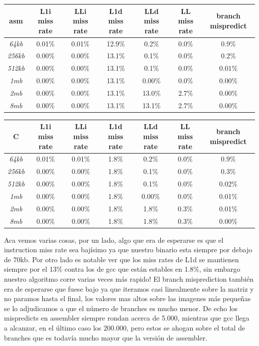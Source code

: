\documentclass[a4paper]{article}
\begin{document}
\begin{center}
	\begin{tabular}[c]{|c|c|c|c|c|c|c|}
    \hline
        \textbf{asm} &  \textbf{L1i miss rate} & \textbf{LLi miss rate} & \textbf{L1d miss rate} & \textbf{LLd miss rate} & \textbf{LL miss rate} & \textbf{branch mispredict}\\
        \hline
\textit{64kb} &    0.01\%  & 0.01\% & 12.9\% & 0.2\% & 0.0\% & 0.9\% \\
        \hline
\textit{256kb} &   0.00\%    & 0.00\% & 13.1\% & 0.1\% & 0.0\% & 0.2\% \\
        \hline
\textit{512kb} & 0.00\%    & 0.00\% & 13.1\%   &   0.1\% & 0.0\% & 0.01\% \\
        \hline
\textit{1mb} &  0.00\%    & 0.00\% & 13.1\%  & 0.00\%  & 0.0\% & 0.00\% \\
        \hline
\textit{2mb} &  0.00\%    & 0.00\% & 13.1\% & 13.0\% & 2.7\% & 0.00\% \\
        \hline
\textit{8mb} &  0.00\%    & 0.00\% & 13.1\% & 13.1\% & 2.7\% & 0.00\% \\
        \hline
    \end{tabular}
    
    
    	\begin{tabular}[c]{|c|c|c|c|c|c|c|}
    \hline
        \textbf{C} &  \textbf{L1i miss rate} & \textbf{LLi miss rate} & \textbf{L1d miss rate} & \textbf{LLd miss rate} & \textbf{LL miss rate} & \textbf{branch mispredict}\\
        \hline
\textit{64kb} &    0.01\%  & 0.01\% & 1.8\% & 0.2\% & 0.0\% & 0.9\% \\
        \hline
\textit{256kb} &   0.00\%    & 0.00\% & 1.8\% & 0.1\% & 0.0\% & 0.3\% \\
        \hline
\textit{512kb} & 0.00\%    & 0.00\% & 1.8\%   &   0.1\% & 0.0\% & 0.02\% \\
        \hline
\textit{1mb} &  0.00\%    & 0.00\% & 1.8\%  & 0.00\%  & 0.0\% & 0.01\% \\
        \hline
\textit{2mb} &  0.00\%    & 0.00\% & 1.8\% & 1.8\% & 0.3\% & 0.01\% \\
        \hline
\textit{8mb} &  0.00\%    & 0.00\% & 1.8\% & 1.8\% & 0.3\% & 0.00\% \\
        \hline
    \end{tabular}
\end{center}

Aca vemos varias cosas, por un lado, algo que era de esperarse es que el instruction miss rate sea bajísimo ya que nuestro binario esta siempre por debajo de 70kb. Por otro lado es notable ver que los miss rates de L1d se mantienen siempre por el 13\% contra los de gcc que están estables en 1.8\%, sin embargo nuestro algoritmo corre varias veces más rapido! El branch misprediction también era de esperarse que fuese bajo ya que iteramos casi linealmente sobre la matriz y no paramos hasta el final, los valores mas altos sobre las imagenes más pequeñas se lo adjudicamos a que el número de branches es mucho menor. De echo los mispredicts en assembler siempre rondan acerca de 5.000, mientras que gcc llega a alcanzar, en el último caso los 200.000, pero estos se ahogan sobre el total de branches que es todavía mucho mayor que la versión de assembler.
\end{document}
